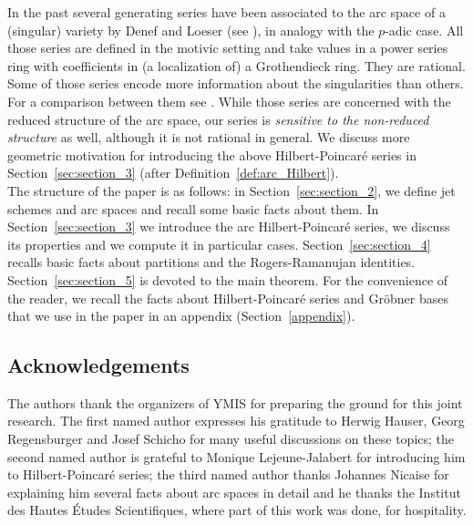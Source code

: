In the past several generating series have been associated to
the arc space of a (singular) variety by Denef and Loeser (see
\cite{denef_loeser,denef_loeser_definable_sets}), in analogy with the
$p$-adic case. All those series are defined in the motivic setting and
take values in a power series ring with coefficients in (a
localization of) a Grothendieck ring. They are rational. Some of those
series encode more information about the singularities than
others. For a comparison between them see
\cite{nicaise_manuscripta,nicaise,helena_pedro}. While those series
are concerned with the reduced structure of the arc space, our series
is \emph{sensitive to the non-reduced structure} as well, although it is not
rational in general. We discuss more geometric motivation for introducing the above Hilbert-Poincar\'{e} series in Section~\ref{sec:section_3} (after Definition~\ref{def:arc_Hilbert}).\\

The structure of the paper is as follows: in Section~\ref{sec:section_2}, we define jet schemes and arc spaces and recall some basic facts about them.
In Section~\ref{sec:section_3} we introduce the arc
Hilbert-Poincar\'{e} series, we discuss its properties and we compute
it in particular cases. Section~\ref{sec:section_4} recalls basic
facts about partitions and the Rogers-Ramanujan
identities. Section~\ref{sec:section_5} is devoted to the main
theorem. For the convenience of the reader, we recall the facts about
Hilbert-Poincar\'{e} series and Gr\"obner bases that we use in the
paper in an appendix (Section~\ref{appendix}).

\subsection*{Acknowledgements} 
The authors thank the organizers of YMIS for preparing the ground for
this joint research. The first named author expresses his gratitude to
Herwig Hauser, Georg Regensburger and Josef Schicho for many useful
discussions on these topics; the second named author is grateful to
Monique Lejeune-Jalabert for introducing him to Hilbert-Poincar\'{e}
series; the third named author thanks Johannes Nicaise for explaining 
him several facts about arc spaces in detail and he thanks the
Institut des Hautes \'{E}tudes Scientifiques, where part of this work
was done, for hospitality.\\

